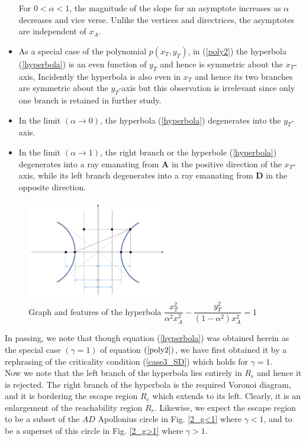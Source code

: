\documentclass[final,5p,times,twocolumn]{elsarticle}
\begin{document}
\begin{itemize}
For $0<\alpha<1$, the magnitude of the slope for an asymptote increases as $\alpha$ decreases and vice verse. Unlike the vertices and directrices, the asymptotes are independent of $x_A$.
\item As a special case of the polynomial $p(x_T,y_T)$, in (\ref{poly2}) the hyperbola (\ref{hyperbola}) is an even function of $y_T$ and hence is symmetric about the $x_T$-axis, Incidently the hyperbola is also even in $x_T$ and hence its two branches are symmetric about the $y_T$-axis but this observation is irrelevant since only one branch is retained in further study.
\item In the limit $(\alpha\to0)$, the hyperbola (\ref{hyperbola}) degenerates into the $y_T$-axis.
\item In the limit $(\alpha\to1)$, the right branch or the hyperbole (\ref{hyperbola}) degenerates into a ray emanating from $\boldsymbol{A}$ in the positive direction of the $x_T$-axis, while its left branch degenerates into a ray emanating from $\boldsymbol{D}$ in the opposite direction.
\end{itemize}    

\begin{figure}[htb]
\centering
\includegraphics[width=0.55\textwidth]{Drawing5_1.pdf}
\caption{Graph and features of the hyperbola $\dfrac{x_T^2}{\alpha^2 x_A^2} - \dfrac{y_T^2}{(1-\alpha^2)x_A^2}=1$ }
\label{hyperbola graph}
\end{figure}


In passing, we note that though equation (\ref{hyperbola}) was obtained herein as the special case $(\gamma=1)$ of equation $(\ref{poly2})$, we have first obtained it by a rephrasing of the criticality condition (\ref{case3_SD}) which holds for $\gamma=1$.\\


Now we note that the left branch of the hyperbola lies entirely in $R_{r}$ and hence it is rejected. The right branch of the hyperbola is the required Voronoi diagram, and it is bordering the escape region $R_{e}$ which extends to its left. Clearly, it is an enlargement of the reachability region $R_{r}$. Likewise, we expect the escape region to be a subset of the $AD$ Apollonius circle in Fig. \ref{2_g<1} where $\gamma<1$, and to be a superset of this circle in Fig. \ref{2_g>1} where $\gamma>1$.   
\end{document}
